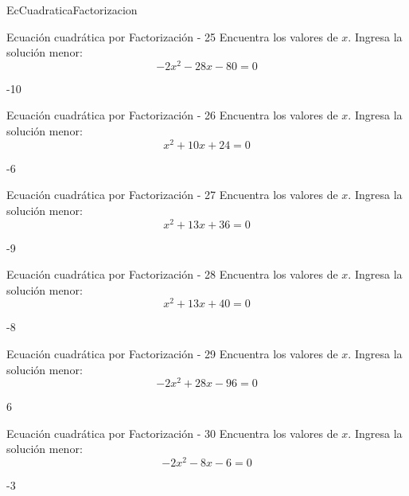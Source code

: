 \documentclass[a4,11pt]{aleph-notas}
\begin{document}
\begin{quiz}{EcCuadraticaFactorizacion}
\begin{numerical}[]%
    {Ecuación cuadrática por Factorización - 25}
    Encuentra los valores de $x$. Ingresa la solución menor:
    \[
        - 2 x^{2} - 28 x - 80 = 0
    \]
    \item[] -10
\end{numerical}

\begin{numerical}[]%
    {Ecuación cuadrática por Factorización - 26}
    Encuentra los valores de $x$. Ingresa la solución menor:
    \[
        x^{2} + 10 x + 24 = 0
    \]
    \item[] -6
\end{numerical}

\begin{numerical}[]%
    {Ecuación cuadrática por Factorización - 27}
    Encuentra los valores de $x$. Ingresa la solución menor:
    \[
        x^{2} + 13 x + 36 = 0
    \]
    \item[] -9
\end{numerical}

\begin{numerical}[]%
    {Ecuación cuadrática por Factorización - 28}
    Encuentra los valores de $x$. Ingresa la solución menor:
    \[
        x^{2} + 13 x + 40 = 0
    \]
    \item[] -8
\end{numerical}

\begin{numerical}[]%
    {Ecuación cuadrática por Factorización - 29}
    Encuentra los valores de $x$. Ingresa la solución menor:
    \[
        - 2 x^{2} + 28 x - 96 = 0
    \]
    \item[] 6
\end{numerical}

\begin{numerical}[]%
    {Ecuación cuadrática por Factorización - 30}
    Encuentra los valores de $x$. Ingresa la solución menor:
    \[
        - 2 x^{2} - 8 x - 6 = 0
    \]
    \item[] -3
\end{numerical}


\end{quiz}
\end{document}
